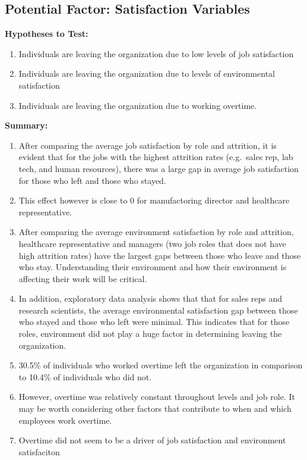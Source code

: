 \documentclass[
]{article}
\providecommand{\tightlist}{%
  \setlength{\itemsep}{0pt}\setlength{\parskip}{0pt}}
\begin{document}
\hypertarget{potential-factor-satisfaction-variables}{%
\subsection{Potential Factor: Satisfaction
Variables}\label{potential-factor-satisfaction-variables}}

\textbf{Hypotheses to Test:}

\begin{enumerate}
\def\labelenumi{\arabic{enumi}.}
\tightlist
\item
  Individuals are leaving the organization due to low levels of job
  satisfaction
\item
  Individuals are leaving the organization due to levels of
  environmental satisfaction
\item
  Individuals are leaving the organization due to working overtime.
\end{enumerate}

\textbf{Summary:}

\begin{enumerate}
\def\labelenumi{\arabic{enumi}.}
\tightlist
\item
  After comparing the average job satisfaction by role and attrition, it
  is evident that for the jobs with the highest attrition rates
  (e.g.~sales rep, lab tech, and human resources), there was a large gap
  in average job satisfaction for those who left and those who stayed.
\item
  This effect however is close to 0 for manufactoring director and
  healthcare representative.
\item
  After comparing the average environment satisfaction by role and
  attrition, healthcare representative and managers (two job roles that
  does not have high attrition rates) have the largest gaps between
  those who leave and those who stay. Understanding their environment
  and how their environment is affecting their work will be critical.
\item
  In addition, exploratory data analysis shows that that for sales reps
  and research scientists, the average environmental satisfaction gap
  between those who stayed and those who left were minimal. This
  indicates that for those roles, environment did not play a huge factor
  in determining leaving the organization.
\item
  30.5\% of individuals who worked overtime left the organization in
  comparison to 10.4\% of individuals who did not.
\item
  However, overtime was relatively constant throughout levels and job
  role. It may be worth considering other factors that contribute to
  when and which employees work overtime.
\item
  Overtime did not seem to be a driver of job satisfaction and
  environment satisfaciton
\end{enumerate}
\end{document}
